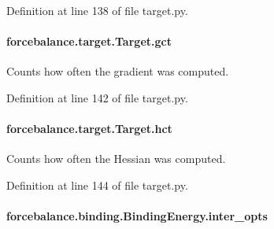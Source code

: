 Definition at line 138 of file target.\-py.

\hypertarget{classforcebalance_1_1target_1_1Target_aa625ac88c6744eb14ef281d9496d0dbb}{
\paragraph[{gct}]{\setlength{\rightskip}{0pt plus 5cm}forcebalance.\-target.\-Target.\-gct\hspace{0.3cm}{\ttfamily [inherited]}}}\label{classforcebalance_1_1target_1_1Target_aa625ac88c6744eb14ef281d9496d0dbb}


Counts how often the gradient was computed. 



Definition at line 142 of file target.\-py.

\hypertarget{classforcebalance_1_1target_1_1Target_a5b5a42f78052b47f29ed4b940c6111a1}{
\paragraph[{hct}]{\setlength{\rightskip}{0pt plus 5cm}forcebalance.\-target.\-Target.\-hct\hspace{0.3cm}{\ttfamily [inherited]}}}\label{classforcebalance_1_1target_1_1Target_a5b5a42f78052b47f29ed4b940c6111a1}


Counts how often the Hessian was computed. 



Definition at line 144 of file target.\-py.

\hypertarget{classforcebalance_1_1binding_1_1BindingEnergy_a9d1f28fc62222da17c0fd12593042f10}{
\paragraph[{inter\-\_\-opts}]{\setlength{\rightskip}{0pt plus 5cm}forcebalance.\-binding.\-Binding\-Energy.\-inter\-\_\-opts}}\label{classforcebalance_1_1binding_1_1BindingEnergy_a9d1f28fc62222da17c0fd12593042f10}


